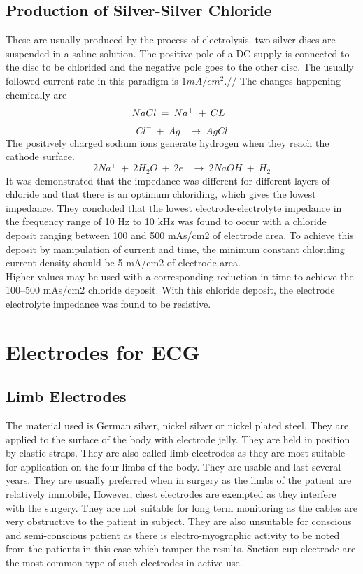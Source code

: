\documentclass{article}
\begin{document}
\subsection{Production of Silver-Silver Chloride}
These are usually produced by the process of electrolysis. two silver discs are suspended in a saline solution. The positive pole of a DC supply is connected to the disc to be chlorided and the negative pole goes to the other disc. The usually followed current rate in this paradigm is $1mA/cm^2$.//
The changes happening chemically are - 
\begin{equation}
    NaCl \: =\: Na^+ \: + \: CL^- \\
\end{equation}
\begin{equation}
    Cl^- \: + \: Ag^+ \: \rightarrow \: AgCl
\end{equation}
The positively charged sodium ions generate hydrogen when they reach the cathode surface.
\begin{equation}
    2Na^+ \: + \: 2H_2O \: +\: 2e^-\: \rightarrow \: 2NaOH \: + \:H_2
\end{equation}
It was demonstrated that the impedance was different for different layers of chloride and that there is an optimum chloriding, which gives the lowest impedance. They concluded that the lowest electrode-electrolyte impedance in the frequency range of 10 Hz to 10 kHz was found to occur with a chloride deposit ranging between 100 and 500 mAs/cm2 of electrode area. To achieve this deposit by manipulation of current and time, the minimum constant chloriding current density should be 5 mA/cm2 of electrode area.
\\Higher values may be used with a corresponding reduction in time to achieve the 100–500 mAs/cm2 chloride deposit. With this chloride deposit, the electrode electrolyte impedance was found to be resistive.
\section{Electrodes for ECG}
\subsection{Limb Electrodes}
The material used is German silver, nickel silver or nickel plated steel. They are applied to the surface of the body with electrode jelly. They are held in position by elastic straps. They are also called limb electrodes as they are most suitable for application on the four limbs of the body. They are usable and last several years. They are usually preferred when in surgery as the limbs of the patient are relatively immobile, However, chest electrodes are exempted as they interfere with the surgery. They are not suitable for long term monitoring as the cables are very obstructive to the patient in subject. They are also unsuitable for conscious and semi-conscious patient as there is electro-myographic activity to be noted from the patients in this case which tamper the results. Suction cup electrode are the most common type of such electrodes in active use.
\end{document}
